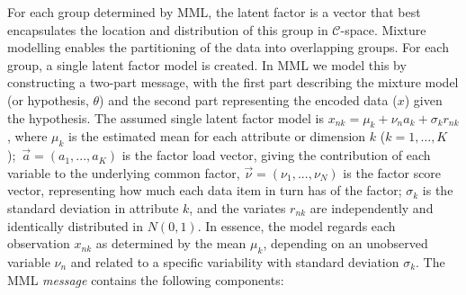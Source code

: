 \documentclass{elsarticle}
\newcommand{\Cspaceno}{$\mathcal{C}$-space}
\begin{document}

For each group determined by MML, the latent factor is a vector that best encapsulates the location 
and distribution of this group in \Cspaceno.
Mixture modelling enables the partitioning of the data into overlapping groups. 
For each group, a single latent factor model is created. 
In MML we  model this by constructing a two-part message, with the first part describing the mixture 
model (or hypothesis, $\theta$) and the second part representing the encoded data ($x$) given the hypothesis. 
The assumed single latent factor model is $x_{n k} = \mu_k + \nu_n a_k + \sigma_k r_{n k}$, where $\mu_k$ is the 
estimated mean for each attribute or dimension $k$ ($k=1, \ldots, K$);~$\vec{a} = (a_1,  ...,  a_K)$ is the factor load vector, giving the 
contribution of each variable to the underlying common factor, $\vec{\nu} = (\nu_1, ..., \nu_N)$ is the 
factor score vector, representing how much each data item in turn has of the factor;
$\sigma_k$ is the standard deviation in 
attribute $k$, and the variates $r_{n k}$ are independently and identically distributed  
in $N(0, 1)$. In essence, the model regards each observation $x_{n k}$ as determined by the 
mean $\mu_k$, depending on an unobserved variable $\nu_n$ and related to a specific 
variability with standard deviation $\sigma_k$. The MML \textit{message} contains the following components: 

\end{document}
